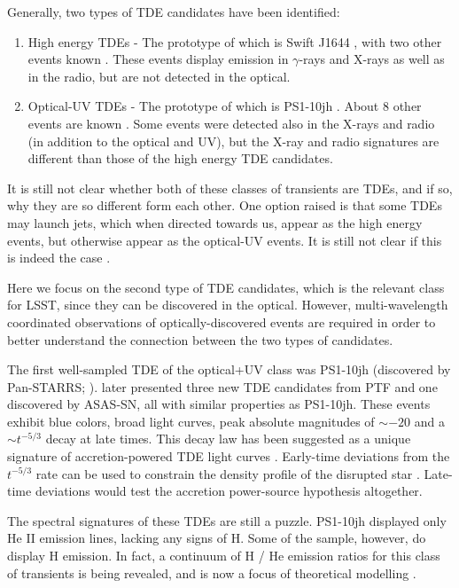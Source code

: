 Generally, two types of TDE candidates have been identified:
\begin{enumerate}
\item High energy TDEs - The prototype of which is Swift J1644
\citep{Bloom2011, Burrows2011, Levan2011, Zauderer2011}, with two other
events known \citep{Cenko2012, Brown2015}. These events display emission
in $\gamma$-rays and X-rays as well as in the radio, but are not
detected in the optical.
\item Optical-UV TDEs - The prototype of which is PS1-10jh
\citep{Gezari2012}. About $8$ other events are known
\citep{Chornock2014, Arcavi2014, Holoien2014, Holoien2015, Holoien2016}.
Some events were detected also in the X-rays and radio (in addition to
the optical and UV), but the X-ray and radio signatures are different
than those of the high energy TDE candidates.
\end{enumerate}

It is still not clear whether both of these classes of transients are TDEs,
and if so, why they are so different form each other. One option raised is
that some TDEs may launch jets, which when directed towards us, appear as
the high energy events, but otherwise appear as the optical-UV events.
It is still not clear if this is indeed the case \citep[e.g.][]{VanVelzen2013}.

Here we focus on the second type of TDE candidates, which is the
relevant class for LSST, since they can be discovered in the optical.
However, multi-wavelength coordinated observations of
optically-discovered events are required in order to better understand
the connection between the two types of candidates.

The first well-sampled TDE of the optical+UV class was PS1-10jh (discovered by Pan-STARRS;
\citealt{Gezari2012}). \citet{Arcavi2014} later presented three new TDE candidates
from PTF and one discovered by ASAS-SN, all with similar properties
as PS1-10jh. These events exhibit blue colors, broad light curves,
peak absolute magnitudes of $\sim-20$ and a $\sim t^{-5/3}$ decay
at late times. This decay law has been suggested as a unique signature
of accretion-powered TDE light curves \citep{Rees1988, Evans1989, Phinney1989}.
Early-time deviations from the $t^{-5/3}$ rate
can be used to constrain the density profile of the disrupted star
\citep{Lodato2009, Gezari2012}. Late-time deviations would
test the accretion power-source hypothesis altogether.

The spectral signatures of these TDEs are still a puzzle. PS1-10jh displayed
only He II emission lines, lacking any signs of H. Some of the \citet{Arcavi2014}
sample, however, do display H emission.
In fact, a continuum of H / He emission ratios for this class of transients
is being revealed, and is now a focus of theoretical modelling \citep{Strubbe2015, Roth2015}.

